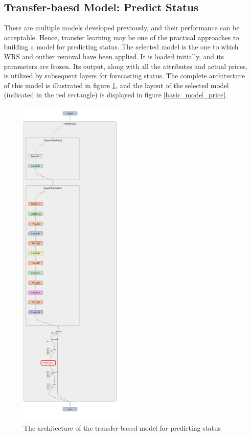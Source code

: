 \documentclass[12pt,twoside]{report}
\begin{document}
\subsection{Transfer-baesd Model: Predict Status}
There are multiple models developed previously, and their performance can be acceptable. Hence, transfer learning may be one of the practical approaches to building a model for predicting status. The selected model is the one to which WRS and outlier removal have been applied. It is loaded initially, and its parameters are frozen. Its output, along with all the attributes and actual prices, is utilized by subsequent layers for forecasting status. The complete architecture of this model is illustrated in figure \ref{transfer_layout}, and the layout of the selected model (indicated in the red rectangle) is displayed in figure \ref{basic_model_price}.

\begin{figure}[!htbp]
	\centering
	\includegraphics[height=17cm]{transfer_layout}
	\caption{The architecture of the transfer-based model for predicting status}
	\label{transfer_layout}
\end{figure}
\end{document}
